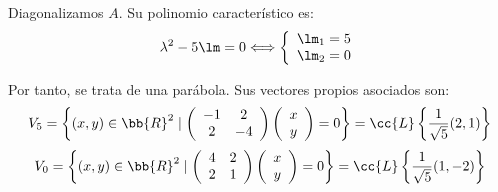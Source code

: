 \begin{ejercicio}
\begin{enumerate}
        Diagonalizamos $A$. Su polinomio característico es:
        \begin{equation*}
            \lambda^2 -5\lm = 0 \Longleftrightarrow \left\{\begin{array}{l}
                \lm_1 = 5\\
                \lm_2 = 0
            \end{array}\right.
        \end{equation*}

        Por tanto, se trata de una parábola. Sus vectores propios asociados son:
        \begin{equation*}
            V_{5} = \left\{(x,y)\in \bb{R}^2 \mid \left(\begin{array}{cc}
                -1 & 2 \\
                2 & -4\\ 
            \end{array}\right)\left(\begin{array}{c}
                x\\y
            \end{array}\right)=0 \right\} = \cc{L}\left\{\frac{1}{\sqrt{5}}(2,1)\right\}
        \end{equation*}
        \begin{equation*}
            V_{0} = \left\{(x,y)\in \bb{R}^2 \mid \left(\begin{array}{cc}
                4 & 2 \\
                2 & 1\\ 
            \end{array}\right)\left(\begin{array}{c}
                x\\y
            \end{array}\right)=0 \right\} = \cc{L}\left\{\frac{1}{\sqrt{5}}(1,-2)\right\}
        \end{equation*}


\end{enumerate}
\end{ejercicio}
